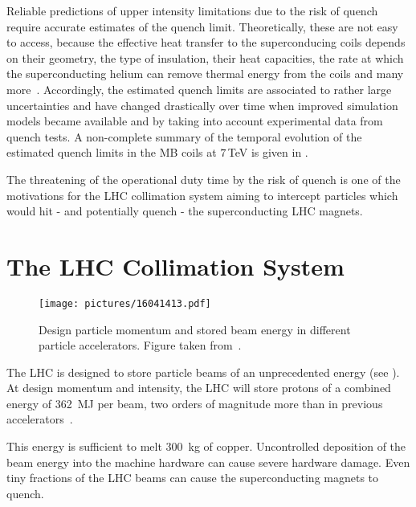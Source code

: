 
Reliable predictions of upper intensity limitations due to the risk of quench require accurate estimates of the quench limit. Theoretically, these are not easy to access, because the effective heat transfer to the superconducing coils depends on their geometry, the type of insulation, their heat capacities, the rate at which the superconducting helium can remove thermal energy from the coils and many more~\cite{ipac13:THPEA045}. Accordingly, the estimated quench limits are associated to rather large uncertainties and have changed drastically over time when improved simulation models became available and by taking into account experimental data from quench tests. A non-complete summary of the temporal evolution of the estimated quench limits in the MB coils at $7\,$TeV is given in .

The threatening of the operational duty time by the risk of quench is one of the motivations for the LHC collimation system aiming to intercept particles which would hit - and potentially quench - the superconducting LHC magnets.



\section{The LHC Collimation System}\label{chap:3}
%
\begin{figure}[b]  
    \centering
    \texttt{[image: pictures/16041413.pdf]}
    \caption{Design particle momentum and stored beam energy in different particle accelerators. Figure taken from~\cite{collimationsystemref1}.}  
    \label{pic:16041401}
\end{figure}
%
The LHC is designed to store particle beams of an unprecedented energy (see ). At design momentum and intensity, the LHC will store protons of a combined energy of 362~MJ per beam, two orders of magnitude more than in previous accelerators~\cite{CERN-2004-003-V1,collimationsystemref1}. 

This energy is sufficient to melt 300~kg of copper. Uncontrolled deposition of the beam energy into the machine hardware can cause severe hardware damage. Even tiny fractions of the LHC beams can cause the superconducting magnets to quench.

